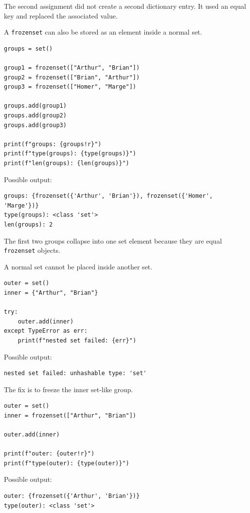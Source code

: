 The second assignment did not create a second dictionary entry. It used an equal key and replaced the associated value.

A \texttt{frozenset} can also be stored as an element inside a normal set.

\begin{verbatim}
groups = set()

group1 = frozenset(["Arthur", "Brian"])
group2 = frozenset(["Brian", "Arthur"])
group3 = frozenset(["Homer", "Marge"])

groups.add(group1)
groups.add(group2)
groups.add(group3)

print(f"groups: {groups!r}")
print(f"type(groups): {type(groups)}")
print(f"len(groups): {len(groups)}")
\end{verbatim}

Possible output:

\begin{verbatim}
groups: {frozenset({'Arthur', 'Brian'}), frozenset({'Homer', 'Marge'})}
type(groups): <class 'set'>
len(groups): 2
\end{verbatim}

The first two groups collapse into one set element because they are equal \texttt{frozenset} objects.

A normal set cannot be placed inside another set.

\begin{verbatim}
outer = set()
inner = {"Arthur", "Brian"}

try:
    outer.add(inner)
except TypeError as err:
    print(f"nested set failed: {err}")
\end{verbatim}

Possible output:

\begin{verbatim}
nested set failed: unhashable type: 'set'
\end{verbatim}

The fix is to freeze the inner set-like group.

\begin{verbatim}
outer = set()
inner = frozenset(["Arthur", "Brian"])

outer.add(inner)

print(f"outer: {outer!r}")
print(f"type(outer): {type(outer)}")
\end{verbatim}

Possible output:

\begin{verbatim}
outer: {frozenset({'Arthur', 'Brian'})}
type(outer): <class 'set'>
\end{verbatim}

